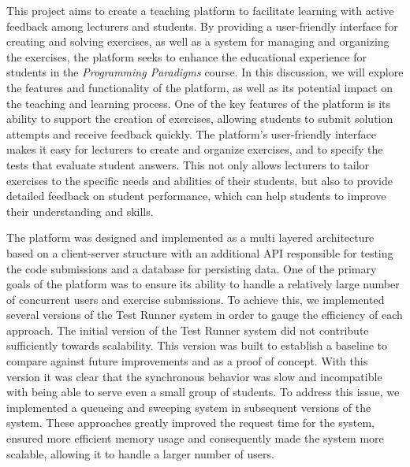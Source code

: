 This project aims to create a teaching platform to facilitate learning with active feedback among lecturers and students. 
By providing a user-friendly interface for creating and solving exercises, as well as a system for managing and organizing the exercises, the platform seeks to enhance the educational experience for students in the \textit{Programming Paradigms} course. 
In this discussion, we will explore the features and functionality of the platform, as well as its potential impact on the teaching and learning process.
One of the key features of the platform is its ability to support the creation of exercises, allowing students to submit solution attempts and receive feedback quickly.
The platform's user-friendly interface makes it easy for lecturers to create and organize exercises, and to specify the tests that evaluate student answers. This not only allows lecturers to tailor exercises to the specific needs and abilities of their students, but also to provide detailed feedback on student performance, which can help students to improve their understanding and skills.

The platform was designed and implemented as a multi layered architecture based on a client-server structure with an additional API responsible for testing the code submissions and a database for persisting data. 
One of the primary goals of the platform was to ensure its ability to handle a relatively large number of concurrent users and exercise submissions. 
To achieve this, we implemented several versions of the Test Runner system in order to gauge the efficiency of each approach. 
The initial version of the Test Runner system did not contribute sufficiently towards scalability.
This version was built to establish a baseline to compare against future improvements and as a proof of concept. With this version it was clear that the synchronous behavior was slow and incompatible with being able to serve even a small group of students.
To address this issue, we implemented a queueing and sweeping system in subsequent versions of the system. These approaches greatly improved the request time for the system, ensured more efficient memory usage and consequently made the system more scalable, allowing it to handle a larger number of users. 

